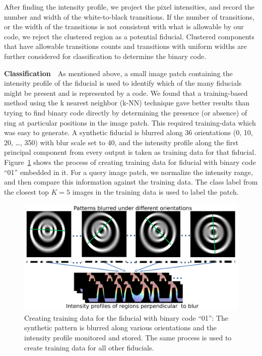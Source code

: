 \documentclass[10pt,twocolumn,letterpaper]{article}
\begin{document}
After finding the intensity profile, we project the pixel intensities,
and record the number and width of the white-to-black transitions.  If
the number of transitions, or the width of the transitions is not
consistent with what is allowable by our code, we reject the clustered
region as a potential fiducial.  Clustered components that have
allowable transitions counts and transitions with uniform widths are
further considered for classification to determine the binary code.

\textbf{Classification}~~As mentioned above, a small image patch
containing the intensity profile of the fiducial is used to identify
which of the many fiducials might be present and is represented by a
code.  We found that a training-based method using the k nearest
neighbor (k-NN) technique gave better results than trying to find
binary code directly by determining the presence (or absence) of ring
at particular positions in the image patch. This required
training-data which was easy to generate. A synthetic fiducial
is blurred along 36 orientations (0, 10, 20, \ldots , 350) with blur
scale set to 40, and the intensity profile along the first principal
component from every output is taken as training data for that
fiducial. Figure~\ref{fig:training_data} shows the process of
creating training data for fiducial with binary code ``01'' embedded
in it.  For a query image patch, we normalize the intensity range, and
then compare this information against the training data. The class
label from the closest top $K=5$ images in the training data is used
to label the patch.

\begin{figure}[h!]
\centering
  \includegraphics[width=0.95\linewidth]{images/training_data.pdf}
  \caption{Creating training data for the fiducial with binary
  code ``01'': The synthetic pattern is blurred along various
  orientations and the intensity profile monitored and stored. The
  same process is used to create training data for all other fiducials.}
  \label{fig:training_data}
\end{figure}
\end{document}
